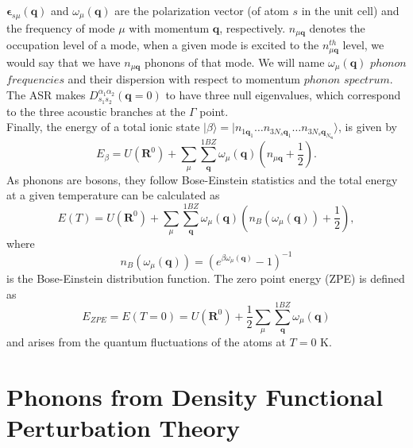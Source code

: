 $\boldsymbol{\epsilon}_{s\mu}(\mathbf{q})$ and $\omega_{\mu}(\mathbf{q})$ are the polarization vector (of atom $s$ in the unit cell) and the frequency of mode $\mu$ with 
momentum $\mathbf{q}$, respectively. $n_{\mu\mathbf{q}}$ denotes the occupation level of a mode, when a given mode is excited to the $n^{th}_{\mu\mathbf{q}}$ level, we would say that we have $n_{\mu\mathbf{q}}$ 
phonons of that mode. We will name $\omega_{\mu}(\mathbf{q})$ $phonon$ $frequencies$ and their dispersion with respect to momentum $phonon$ $spectrum$. The ASR makes $D_{s_{1}s_{2}}^{\alpha_{1}\alpha_{2}}(\mathbf{q}=0)$ to have three null eigenvalues, which correspond to the three acoustic branches at the $\Gamma$ point. \\

Finally, the energy of a total ionic state $|\beta\rangle=|n_{1\mathbf{q}_{1}}\dots n_{3N_{s}\mathbf{q}_{1}}\dots n_{3N_{s}\mathbf{q}_{N_{\mathbf{q}}}}\rangle$, is given by
\begin{equation}
 E_{\beta}=U(\mathbf{R}^{0})+\sum_{\mu}\sum_{\mathbf{q}}^{1BZ}\omega_{\mu}(\mathbf{q})\left(n_{\mu\mathbf{q}}+\frac{1}{2}\right).
\end{equation}
As phonons are bosons, they follow Bose-Einstein statistics and the total energy at a given temperature can be calculated as
\begin{equation}
 E(T)=U(\mathbf{R}^{0})+\sum_{\mu}\sum_{\mathbf{q}}^{1BZ}\omega_{\mu}(\mathbf{q})\left(n_{B}(\omega_{\mu}(\mathbf{q}))+\frac{1}{2}\right),
\end{equation}
where 
\begin{equation}
 n_{B}(\omega_{\mu}(\mathbf{q}))=(e^{\beta\omega_{\mu}(\mathbf{q})}-1)^{-1}
\end{equation}
is the Bose-Einstein distribution function. The zero point energy (ZPE) is defined as
\begin{equation}
 E_{ZPE}=E(T=0)=U(\mathbf{R}^{0})+\frac{1}{2}\sum_{\mu}\sum_{\mathbf{q}}^{1BZ}\omega_{\mu}(\mathbf{q})
\end{equation}
and arises from the quantum fluctuations of the atoms at $T=0$ K.

\section{Phonons from Density Functional Perturbation Theory}
\label{dfpt-2bfc}

